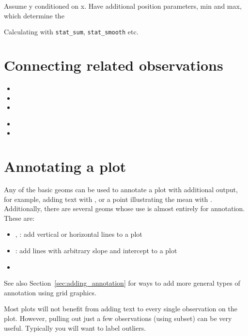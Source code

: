 Assume y conditioned on x.  Have additional position parameters, min and max, which determine the 


Calculating with {\tt stat\_sum}, {\tt stat\_smooth} etc.

\section{Connecting related observations}
\label{sec:connecting}

\begin{itemize}
  \item {}
  \item {}
  \item {}
\end{itemize}

\begin{itemize}
  \item {}
  \item {}
\end{itemize}


\section{Annotating a plot}
\label{sec:annotating}

Any of the basic geoms can be used to annotate a plot with additional output, for example, adding text with , or a point illustrating the mean with .  Additionally, there are several geoms whose use is almost entirely for annotation.  These are:

\begin{itemize}
	\item {}, : add vertical or horizontal lines to a plot
	\item {}: add lines with arbitrary slope and intercept to a plot
	\item {}
\end{itemize}

See also Section~\ref{sec:adding_annotation} for ways to add more general types of annotation using grid graphics.

Most plots will not benefit from adding text to every single observation on the plot.  However, pulling out just a few observations (using subset) can be very useful.  Typically you will want to label outliers.

